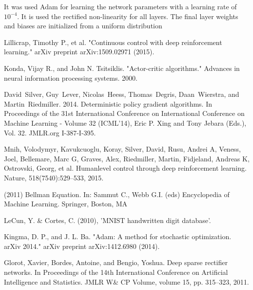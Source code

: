 \documentclass[peerreview,onecolumn]{IEEEtran}
\begin{document}
	 It was used Adam \cite{adam_2014} for learning the network parameters with a learning rate of $10^{-4}$. It is used the rectified non-linearity \cite{relu_2011} for all layers. The final layer weights and biases are initialized from a uniform distribution
 

\begin{thebibliography}{1}

  Lillicrap, Timothy P., et al. "Continuous control with deep reinforcement learning." arXiv preprint arXiv:1509.02971 (2015).
  
  Konda, Vijay R., and John N. Tsitsiklis. "Actor-critic algorithms." Advances in neural information processing systems. 2000.
  
  David~Silver, Guy~Lever, Nicolas~Heess, Thomas~Degris, Daan~Wierstra, and Martin~Riedmiller. 2014. Deterministic policy gradient algorithms. In Proceedings of the 31st International Conference on International Conference on Machine Learning - Volume 32 (ICML'14), Eric P. Xing and Tony Jebara (Eds.), Vol. 32. JMLR.org I-387-I-395.
  
  
  Mnih, Volodymyr, Kavukcuoglu, Koray, Silver, David, Rusu, Andrei A, Veness, Joel, Bellemare,
Marc G, Graves, Alex, Riedmiller, Martin, Fidjeland, Andreas K, Ostrovski, Georg, et al. Humanlevel control through deep reinforcement learning. Nature, 518(7540):529–533, 2015.


(2011) Bellman Equation. In: Sammut C., Webb G.I. (eds) Encyclopedia of Machine Learning. Springer, Boston, MA


	LeCun, Y. \& Cortes, C. (2010), 'MNIST handwritten digit database'.
	
	Kingma, D. P., and J. L. Ba. "Adam: A method for stochastic optimization. arXiv 2014." arXiv preprint arXiv:1412.6980 (2014).
	
	Glorot, Xavier, Bordes, Antoine, and Bengio, Yoshua. Deep sparse rectifier networks. In Proceedings of the 14th International Conference on Artificial Intelligence and Statistics. JMLR W\& CP Volume, volume 15, pp. 315–323, 2011.
	 
\end{thebibliography}

\end{document}
